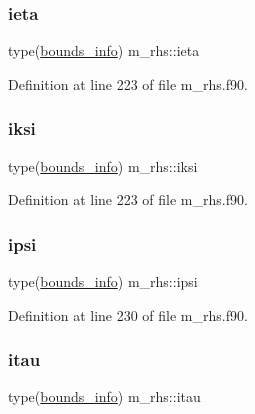 \mbox{\label{namespacem__rhs_a806c4c0942bfd830bb0b8b6276258d01}} 
\subsubsection{\texorpdfstring{ieta}{ieta}}
{\footnotesize\ttfamily type(\hyperlink{structm__derived__types_1_1bounds__info}{bounds\+\_\+info}) m\+\_\+rhs\+::ieta}



Definition at line 223 of file m\+\_\+rhs.\+f90.

\mbox{\label{namespacem__rhs_a6b5d4a4e84fc5b93c1a13151ae398cc6}} 
\subsubsection{\texorpdfstring{iksi}{iksi}}
{\footnotesize\ttfamily type(\hyperlink{structm__derived__types_1_1bounds__info}{bounds\+\_\+info}) m\+\_\+rhs\+::iksi}



Definition at line 223 of file m\+\_\+rhs.\+f90.

\mbox{\label{namespacem__rhs_ae55731ba38044366ff7ddecf95297657}} 
\subsubsection{\texorpdfstring{ipsi}{ipsi}}
{\footnotesize\ttfamily type(\hyperlink{structm__derived__types_1_1bounds__info}{bounds\+\_\+info}) m\+\_\+rhs\+::ipsi}



Definition at line 230 of file m\+\_\+rhs.\+f90.

\mbox{\label{namespacem__rhs_afa742a72b96bfdbfa7d4ed2702f9d5f1}} 
\subsubsection{\texorpdfstring{itau}{itau}}
{\footnotesize\ttfamily type(\hyperlink{structm__derived__types_1_1bounds__info}{bounds\+\_\+info}) m\+\_\+rhs\+::itau}



